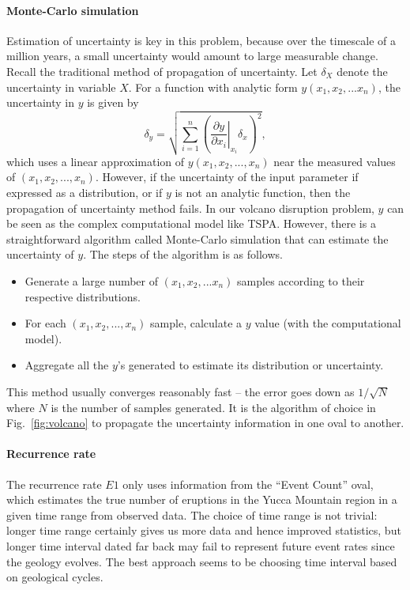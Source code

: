 \documentclass[nofootinbib,preprint,aip,pra]{revtex4-1}
\begin{document}
        \paragraph{Monte-Carlo simulation}
        Estimation of uncertainty is key in this problem, because over the timescale of a million years,
        a small uncertainty would amount to large measurable change. Recall the traditional method of
        propagation of uncertainty. Let $\delta_X$ denote the uncertainty in variable $X$. For a function
        with analytic form $y(x_1,x_2,...x_n)$, the uncertainty in $y$ is given by
        \begin{equation}
            \delta_y = \sqrt{\sum\limits_{i=1}^n \left(\left.\frac{\partial y}{\partial x_i}
            \right\rvert_{x_i} \delta_x\right)^2},
        \end{equation}
        which uses a linear approximation of $y(x_1,x_2,...,x_n)$ near the measured values of
        $(x_1,x_2,...,x_n)$.
        However, if the uncertainty of the input parameter if expressed as a distribution, or if $y$ is
        not an analytic function, then the propagation of uncertainty method fails. In our volcano disruption
        problem, $y$ can be seen as the complex computational model like TSPA. However, there is a
        straightforward algorithm called Monte-Carlo simulation that can estimate the uncertainty of $y$.
        The steps of the algorithm is as follows.
        \begin{itemize}
            \item Generate a large number of $(x_1,x_2,...x_n)$ samples according to their respective distributions.
            \item For each $(x_1,x_2,...,x_n)$ sample, calculate a $y$ value (with the computational model).
            \item Aggregate all the $y$'s generated to estimate its distribution or uncertainty.
        \end{itemize}
        This method usually converges reasonably fast -- the error goes down as $1/\sqrt{N}$ where $N$ is the number
        of samples generated. It is the algorithm of choice in Fig.~\ref{fig:volcano} to
        propagate the uncertainty information in one oval to another.
        \paragraph{Recurrence rate} The recurrence rate $E1$ only uses information from the ``Event Count''
        oval, which estimates the true number of eruptions in the Yucca Mountain region in a given time range
        from observed data. The choice of time range is not trivial: longer time range certainly gives us
        more data and hence improved statistics, but longer time interval dated far back may fail to represent
        future event rates since the geology evolves. The best approach seems to be choosing time interval
        based on geological cycles.
\end{document}
